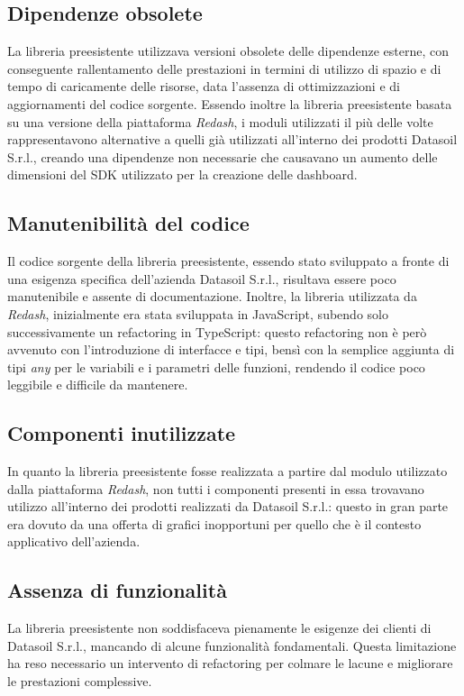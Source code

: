 \subsection{Dipendenze obsolete}
La libreria preesistente utilizzava versioni obsolete delle dipendenze esterne, con conseguente rallentamento delle prestazioni in termini
di utilizzo di spazio e di tempo di caricamente delle risorse, data l'assenza di ottimizzazioni e di aggiornamenti del codice sorgente. \newline
Essendo inoltre la libreria preesistente basata su una versione della piattaforma \textit{Redash}, i moduli utilizzati il più delle volte
rappresentavono alternative a quelli già utilizzati all'interno dei prodotti Datasoil S.r.l., creando una dipendenze non necessarie che
causavano un aumento delle dimensioni del SDK utilizzato per la creazione delle dashboard.

\subsection{Manutenibilità del codice}
Il codice sorgente della libreria preesistente, essendo stato sviluppato a fronte di una esigenza specifica dell'azienda Datasoil S.r.l.,
risultava essere poco manutenibile e assente di documentazione. \newline
Inoltre, la libreria utilizzata da \textit{Redash}, inizialmente era stata sviluppata in JavaScript, subendo solo successivamente un
refactoring in TypeScript: questo refactoring non è però avvenuto con l'introduzione di interfacce e tipi, bensì con la semplice aggiunta
di tipi \textit{any} per le variabili e i parametri delle funzioni, rendendo il codice poco leggibile e difficile da mantenere.

\subsection{Componenti inutilizzate}
In quanto la libreria preesistente fosse realizzata a partire dal modulo utilizzato dalla piattaforma \textit{Redash}, non tutti i componenti presenti
in essa trovavano utilizzo all'interno dei prodotti realizzati da Datasoil S.r.l.: questo in gran parte era dovuto da una offerta di grafici inopportuni
per quello che è il contesto applicativo dell'azienda.

\subsection{Assenza di funzionalità}
La libreria preesistente non soddisfaceva pienamente le esigenze dei clienti di Datasoil S.r.l., mancando di alcune funzionalità fondamentali.
Questa limitazione ha reso necessario un intervento di refactoring per colmare le lacune e migliorare le prestazioni complessive.

